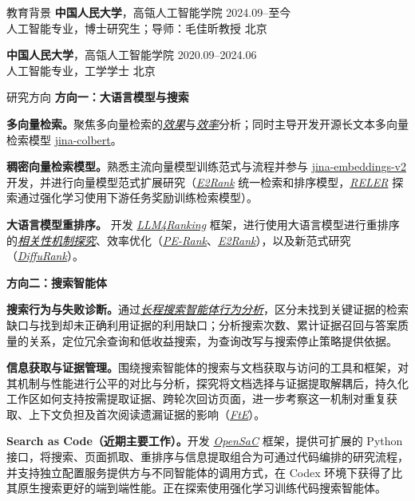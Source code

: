 \documentclass{resume}
\newcommand{\workref}[2]{\hyperref[pub:#1]{\emph{#2}}}
\begin{document}
\begin{rSection}{教育背景}
\textbf{中国人民大学}，高瓴人工智能学院 \hfill 2024.09--至今 \\
人工智能专业，博士研究生；导师：毛佳昕教授 \hfill 北京

\textbf{中国人民大学}，高瓴人工智能学院 \hfill 2020.09--2024.06 \\
人工智能专业，工学学士 \hfill 北京
\end{rSection}

\begin{rSection}{研究方向}
\textbf{方向一：大语言模型与搜索}

\textbf{多向量检索。}聚焦多向量检索的\workref{p08}{效果}与\workref{p07}{效率}分析；同时主导开发开源长文本多向量检索模型 \href{https://huggingface.co/jinaai/jina-colbert-v1-en}{jina-colbert}。

\textbf{稠密向量检索模型。}熟悉主流向量模型训练范式与流程并参与 \href{https://huggingface.co/jinaai/jina-embeddings-v2-base-zh}{jina-embeddings-v2} 开发，并进行向量模型范式扩展研究（\workref{p03}{E2Rank} 统一检索和排序模型，\workref{p01}{RELER} 探索通过强化学习使用下游任务奖励训练检索模型）。

{\sloppy\textbf{大语言模型重排序。} 开发 \workref{p05}{LLM4Ranking} 框架，进行使用大语言模型进行重排序的\workref{p04}{相关性机制探究}、效率优化（\workref{p06}{PE-Rank}、\workref{p03}{E2Rank}），以及新范式研究（\workref{p02}{DiffuRank}）。\par}

\medskip
\textbf{方向二：搜索智能体}

\textbf{搜索行为与失败诊断。}通过\workref{p11}{长程搜索智能体行为分析}，区分未找到关键证据的检索缺口与找到却未正确利用证据的利用缺口；分析搜索次数、累计证据召回与答案质量的关系，定位冗余查询和低收益搜索，为查询改写与搜索停止策略提供依据。

\textbf{信息获取与证据管理。}围绕搜索智能体的搜索与文档获取与访问的工具和框架，对其机制与性能进行公平的对比与分析，探究将文档选择与证据提取解耦后，持久化工作区如何支持按需提取证据、跨轮次回访页面，进一步考察这一机制对重复获取、上下文负担及首次阅读遗漏证据的影响（\workref{p10}{FtE}）。

\textbf{Search as Code（近期主要工作）。}开发 \workref{p09}{OpenSaC} 框架，提供可扩展的 Python 接口，将搜索、页面抓取、重排序与信息提取组合为可通过代码编排的研究流程，并支持独立配置服务提供方与不同智能体的调用方式，在 Codex 环境下获得了比其原生搜索更好的端到端性能。正在探索使用强化学习训练代码搜索智能体。
\end{rSection}
\end{document}
